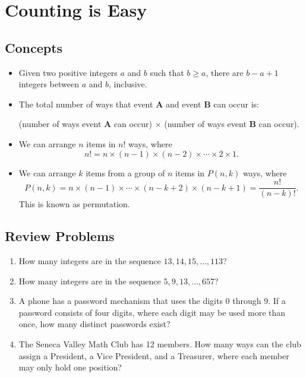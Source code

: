 \documentclass[12pt, letterpaper]{article}
\begin{document}
\section{Counting is Easy}

\subsection{Concepts}

\begin{itemize}
    \item Given two positive integers $a$ and $b$ such that $b\ge a$, there are $b-a+1$ integers between $a$ and $b$, inclusive.
    \item The total number of ways that event \textbf{A} and event \textbf{B} can occur is:
    \begin{center}
        (number of ways event \textbf{A} can occur) $\times$ (number of ways event \textbf{B} can occur).
    \end{center}
    \item We can arrange $n$ items in $n!$ ways, where 
    $$n! = n \times (n-1) \times (n-2) \times \cdots \times 2 \times 1.$$
    \item We can arrange $k$ items from a group of $n$ items in $P(n,k)$ ways, where
    $$P(n,k) = n \times (n-1) \times \cdots \times (n-k+2) \times (n-k+1) = \frac{n!}{(n-k)!}.$$
    This is known as permutation.
\end{itemize}

\subsection{Review Problems}

\begin{enumerate}
    \item How many integers are in the sequence $13, 14, 15,\ldots, 113$?
    \item How many integers are in the sequence $5, 9, 13,\ldots, 657$?
    \item A phone has a password mechanism that uses the digits 0 through 9. If a password consists
    of four digits, where each digit may be used more than once, how many distinct passwords exist?
    \item The Seneca Valley Math Club has 12 members. How many ways can the club assign a President,
    a Vice President, and a Treasurer, where each member may only hold one position?
\end{enumerate}
\end{document}
